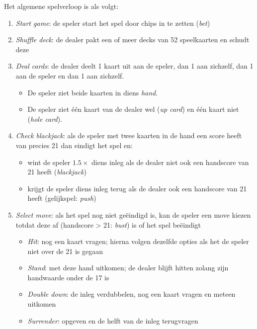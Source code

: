 Het algemene spelverloop is als volgt:
\begin{enumerate}
    \item \textit{Start game}: de speler start het spel door chips in te zetten (\textit{bet})
    \item \textit{Shuffle deck}: de dealer pakt een of meer decks van 52 speelkaarten en schudt deze 
    \item \textit{Deal cards}: de dealer deelt 1 kaart uit aan de speler, dan 1 aan zichzelf, dan 1 aan de speler en dan 1 aan zichzelf.
        \begin{itemize}
            \item De speler ziet beide kaarten in diens \textit{hand}.
            \item De speler ziet één kaart van de dealer wel (\textit{up card}) en één kaart niet (\textit{hole card}).
        \end{itemize}
    \item \textit{Check blackjack}: als de speler met twee kaarten in de hand een score heeft van precies 21
        dan eindigt het spel en:
        \begin{itemize}
            \item wint de speler $1.5\times$ diens inleg als de dealer niet ook een handscore van 21 heeft (\textit{blackjack})
            \item krijgt de speler diens inleg terug als de dealer ook een handscore van 21 heeft (gelijkspel: \textit{push})
        \end{itemize}
    \item \textit{Select move}: als het spel nog niet geëindigd is, kan de speler een move kiezen totdat deze af 
    (handscore > 21: \textit{bust}) is of het spel beëindigt
        \begin{itemize}
            \item \textit{Hit}: nog een kaart vragen; hierna volgen dezelfde opties als het de speler niet over de 21 is gegaan
            \item \textit{Stand}: met deze hand uitkomen; de dealer blijft hitten zolang zijn handwaarde onder de 17 is
            \item \textit{Double down}: de inleg verdubbelen, nog een kaart vragen en meteen uitkomen 
            \item \textit{Surrender}: opgeven en de helft van de inleg terugvragen 
        \end{itemize}
\end{enumerate}


